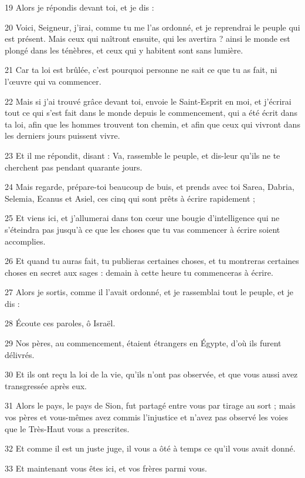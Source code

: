 \par 19 Alors je répondis devant toi, et je dis :
\par 20 Voici, Seigneur, j'irai, comme tu me l'as ordonné, et je reprendrai le peuple qui est présent. Mais ceux qui naîtront ensuite, qui les avertira ? ainsi le monde est plongé dans les ténèbres, et ceux qui y habitent sont sans lumière.
\par 21 Car ta loi est brûlée, c'est pourquoi personne ne sait ce que tu as fait, ni l'œuvre qui va commencer.
\par 22 Mais si j'ai trouvé grâce devant toi, envoie le Saint-Esprit en moi, et j'écrirai tout ce qui s'est fait dans le monde depuis le commencement, qui a été écrit dans ta loi, afin que les hommes trouvent ton chemin, et afin que ceux qui vivront dans les derniers jours puissent vivre.
\par 23 Et il me répondit, disant : Va, rassemble le peuple, et dis-leur qu'ils ne te cherchent pas pendant quarante jours.
\par 24 Mais regarde, prépare-toi beaucoup de buis, et prends avec toi Sarea, Dabria, Selemia, Ecanus et Asiel, ces cinq qui sont prêts à écrire rapidement ;
\par 25 Et viens ici, et j'allumerai dans ton cœur une bougie d'intelligence qui ne s'éteindra pas jusqu'à ce que les choses que tu vas commencer à écrire soient accomplies.
\par 26 Et quand tu auras fait, tu publieras certaines choses, et tu montreras certaines choses en secret aux sages : demain à cette heure tu commenceras à écrire.
\par 27 Alors je sortis, comme il l'avait ordonné, et je rassemblai tout le peuple, et je dis :
\par 28 Écoute ces paroles, ô Israël.
\par 29 Nos pères, au commencement, étaient étrangers en Égypte, d'où ils furent délivrés.
\par 30 Et ils ont reçu la loi de la vie, qu'ils n'ont pas observée, et que vous aussi avez transgressée après eux.
\par 31 Alors le pays, le pays de Sion, fut partagé entre vous par tirage au sort ; mais vos pères et vous-mêmes avez commis l'injustice et n'avez pas observé les voies que le Très-Haut vous a prescrites.
\par 32 Et comme il est un juste juge, il vous a ôté à temps ce qu'il vous avait donné.
\par 33 Et maintenant vous êtes ici, et vos frères parmi vous.

